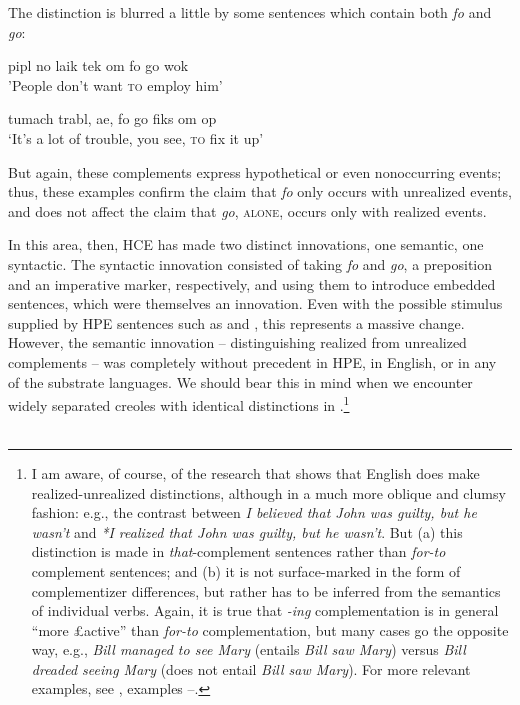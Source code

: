 The distinction is blurred a little by some sentences which contain both \textit{fo} and \textit{go}:

\ea\label{ex:67}
 pipl no laik tek om fo go wok\\
\glt  'People don't want \textsc{to} employ him'
\z

\ea\label{ex:68}
 tumach trabl, ae, fo go fiks om op \\
\glt  `It's a lot of trouble, you see, \textsc{to} fix it up'
\z

\noindent But again, these complements express hypothetical or even nonoccur\-ring events; thus, these examples confirm the claim that \textit{fo} only occurs with unrealized events, and does not affect the claim that \textit{go}, \textsc{alone}, occurs only with realized events.

In this area, then, HCE has made two distinct innovations, one semantic, one syntactic. The syntactic innovation consisted of taking \textit{fo} and \textit{go}, a preposition and an imperative marker, respectively, and using them to introduce embedded sentences, which were themselves an innovation. Even with the possible stimulus supplied by HPE sen\-tences such as  and , this represents a massive change. However, the semantic innovation -- distinguishing realized from unrealized com\-plements -- was completely without precedent in HPE, in English, or in any of the substrate languages. We should bear this in mind when we encounter widely separated creoles with identical distinctions in .\footnote{I am aware, of course, of the research that shows that English does make realized-unrealized distinctions, although in a much more oblique and clumsy fashion: e.g., the contrast between \textit{I believed that John was guilty, but he wasn't} and \textit{*I realized that John was guilty,  but he wasn't}. But (a) this distinction is made in \textit{that}-complement sentences rather than \textit{for-to} complement sentences; and (b) it is not surface-marked in the form of complementizer differences, but rather has to be inferred from the semantics of individual verbs. Again, it is true that \textit{-ing} complementation is in general ``more £active'' than \textit{for-to} complementation, but many cases go the opposite way, e.g., \textit{Bill managed to see Mary} (entails \textit{Bill saw Mary}) versus \textit{Bill dreaded seeing Mary} (does not entail \textit{Bill saw Mary}). For more relevant exam\-ples, see , examples --.}\\\\


